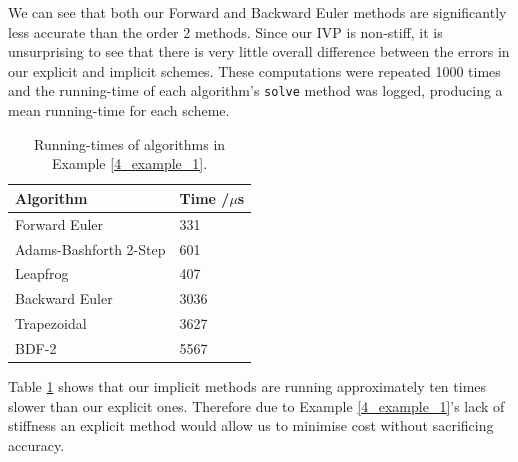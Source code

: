\documentclass[12pt, twoside]{report}
\theoremstyle{plain}
\theoremstyle{definition}
\theoremstyle{definition}
\begin{document}
        We can see that both our Forward and Backward Euler methods are 
        significantly less accurate than the order 2 methods. Since our 
        IVP is non-stiff, it is unsurprising to see that there is very little
        overall difference between the errors in our explicit and implicit 
        schemes. These computations were repeated 1000 times and the 
        running-time of each algorithm's \texttt{solve} method 
        was logged, producing a mean running-time for each scheme. 
        \begin{table}
            \centering
                \begin{tabular}[H]{| l | l |}
                    \hline
                    Algorithm & Time /$\mu$s \\ \hline
                    Forward Euler & 331 \\ \hline
                    Adams-Bashforth 2-Step & 601 \\ \hline
                    Leapfrog & 407 \\ \hline
                    Backward Euler & 3036 \\ \hline
                    Trapezoidal & 3627 \\ \hline
                    BDF-2 & 5567 \\
                    \hline
                \end{tabular}
                \caption{Running-times of algorithms in Example 
                \ref{4_example_1}.}
                \label{4_1_runtimes}
        \end{table}
        Table \ref{4_1_runtimes} shows that our implicit methods are running
        approximately ten times slower than our explicit ones. Therefore due 
        to Example \ref{4_example_1}'s lack of stiffness an explicit method
        would allow us to minimise cost without sacrificing accuracy. 
        
\end{document}

